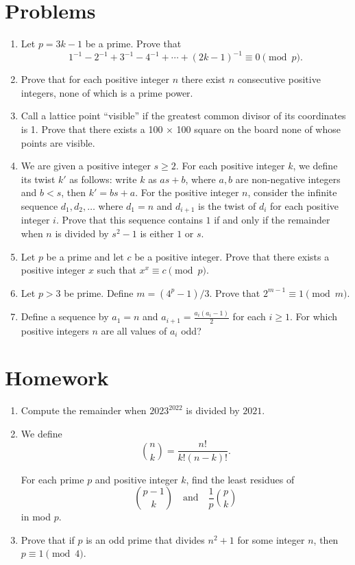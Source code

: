 \documentclass{article}
\begin{document}
\section{Problems}
\begin{enumerate}
  \item Let $p=3k-1$ be a prime. Prove that
    \[1^{-1}-2^{-1}+3^{-1}-4^{-1}+\cdots+(2k-1)^{-1}\equiv 0\pmod p.\]
  \item Prove that for each positive integer $n$ there exist $n$ consecutive
    positive integers, none of which is a prime power.
  \item Call a lattice point ``visible'' if the greatest
    common divisor of its coordinates is 1. Prove that there exists a 100 × 100
    square on the board none of whose points are visible.
  \item We are given a positive integer $s \ge 2$. For each positive integer
    $k$, we define its twist $k'$ as follows: write $k$ as $as+b$, where $a, b$
    are non-negative integers and $b < s$, then $k' = bs+a$. For the positive
    integer $n$, consider the infinite sequence $d_1, d_2, \dots$ where $d_1=n$
    and $d_{i+1}$ is the twist of $d_i$ for each positive integer $i$.
    Prove that this sequence contains $1$ if and only if the remainder when $n$
    is divided by $s^2-1$ is either $1$ or $s$.
  \item Let $p$ be a prime and let $c$ be a positive integer. Prove that there
    exists a positive integer $x$ such that $x^x\equiv c\pmod p$.
  \item Let $p>3$ be prime. Define $m=(4^p-1)/3$. Prove that $2^{m-1}\equiv
    1\pmod m$.
  \item Define a sequence by $a_1=n$ and $a_{i+1}=\frac{a_i(a_i-1)}2$ for each
    $i\ge 1$. For which positive integers $n$ are all values of $a_i$ odd?
\end{enumerate}
\newpage
\section{Homework}
\begin{enumerate}
  \item Compute the remainder when $2023^{2022}$ is divided by $2021$.
  \item 
    We define
    \[\binom nk=\frac{n!}{k!(n-k)!}.\]

    For each prime $p$ and positive integer $k$, find the least residues of 
    \[\binom {p-1}k\quad\text{and}\quad\frac1p\binom pk\] in mod $p$.
  \item Prove that if $p$ is an odd prime that divides $n^2+1$ for some integer
    $n$, then $p\equiv 1\pmod 4$.
\end{enumerate}
\end{document}
